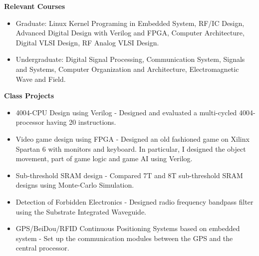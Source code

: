 \documentclass[]{article}
\begin{document}
\noindent \textbf{Relevant Courses}
\begin{itemize}
\item Graduate:
                    Linux Kernel Programing in Embedded System, RF/IC Design,
                    Advanced Digital Design with Verilog and FPGA, Computer
                    Architecture, Digital VLSI Design, RF Analog VLSI Design. 
\item Undergraduate:
                    Digital Signal Processing, Communication System, Signals
                    and Systems, Computer Organization and 
                    Architecture, Electromagnetic Wave and Field. 
\end{itemize}


\noindent \textbf{Class Projects}
\begin{itemize}
\item 4004-CPU Design using Verilog - 
Designed and evaluated a multi-cycled 4004-processor having 20 instructions.

\item Video game design using FPGA - 
Designed an old fashioned game on Xilinx Spartan 6 with monitors and keyboard.
In particular, I designed the object movement, part of game logic and game AI
using Verilog.

\item Sub-threshold SRAM design - 
Compared 7T and 8T sub-threshold SRAM designs using Monte-Carlo Simulation.
	
\item Detection of Forbidden Electronics -
Designed radio frequency bandpass filter using the Substrate Integrated
Waveguide.

\item GPS/BeiDou/RFID Continuous Positioning Systems based on embedded system -
Set up the communication modules between the GPS and the central processor.

\end{itemize}
\end{document}
